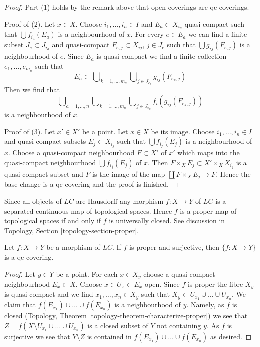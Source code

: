 \begin{proof}
Part (1) holds by the remark above that open coverings are qc coverings.

\medskip\noindent
Proof of (2). Let $x \in X$. Choose $i_1, \ldots, i_n \in I$ and
$E_a \subset X_{i_a}$ quasi-compact such that $\bigcup f_{i_a}(E_a)$
is a neighbourhood of $x$. For every $e \in E_a$ we can find
a finite subset $J_e \subset J_{i_a}$ and quasi-compact
$F_{e, j} \subset X_{ij}$, $j \in J_e$ such that $\bigcup g_{ij}(F_{e, j})$
is a neighbourhood of $e$. Since $E_a$ is quasi-compact we find
a finite collection $e_1, \ldots, e_{m_a}$ such that
$$
E_a \subset
\bigcup\nolimits_{k = 1, \ldots, m_a}
\bigcup\nolimits_{j \in J_{e_k}} g_{ij}(F_{e_k, j})
$$
Then we find that
$$
\bigcup\nolimits_{a = 1, \ldots, n}
\bigcup\nolimits_{k = 1, \ldots, m_a}
\bigcup\nolimits_{j \in J_{e_k}} f_i(g_{ij}(F_{e_k, j}))
$$
is a neighbourhood of $x$.

\medskip\noindent
Proof of (3). Let $x' \in X'$ be a point. Let $x \in X$ be its image.
Choose $i_1, \ldots, i_n \in I$ and quasi-compact subsets
$E_j \subset X_{i_j}$ such that $\bigcup f_{i_j}(E_j)$ is a
neighbourhood of $x$. Choose a quasi-compact neighbourhood $F \subset X'$
of $x'$ which maps into the quasi-compact neighbourhood
$\bigcup f_{i_j}(E_j)$ of $x$. Then
$F \times_X E_j \subset X' \times_X X_{i_j}$ is a
quasi-compact subset and $F$ is the image of the map
$\coprod F \times_X E_j \to F$. Hence the base change is a
qc covering and the proof is finished.
\end{proof}

\noindent
Since all objects of $\textit{LC}$ are Hausdorff any morphism
$f : X \to Y$ of $\textit{LC}$ is a separated continuous map
of topological spaces. Hence $f$ is a proper map of topological spaces
if and only if $f$ is universally closed. See discussion in
Topology, Section \ref{topology-section-proper}.

\begin{lemma}
\label{lemma-proper-surjective-is-qc-covering}
Let $f : X \to Y$ be a morphism of $\textit{LC}$.
If $f$ is proper and surjective, then $\{f : X \to Y\}$
is a qc covering.
\end{lemma}

\begin{proof}
Let $y \in Y$ be a point. For each $x \in X_y$ choose a quasi-compact
neighbourhood $E_x \subset X$. Choose $x \in U_x \subset E_x$ open.
Since $f$ is proper the fibre $X_y$ is quasi-compact and we find
$x_1, \ldots, x_n \in X_y$ such that
$X_y \subset U_{x_1} \cup \ldots \cup U_{x_n}$.
We claim that $f(E_{x_1}) \cup \ldots \cup f(E_{x_n})$ is a neighbourhood of
$y$. Namely, as $f$ is closed
(Topology, Theorem \ref{topology-theorem-characterize-proper})
we see that $Z = f(X \setminus U_{x_1} \cup \ldots \cup U_{x_n})$
is a closed subset of $Y$ not containing $y$. As $f$ is surjective
we see that $Y \setminus Z$ is contained in
$f(E_{x_1}) \cup \ldots \cup f(E_{x_n})$ as desired.
\end{proof}

